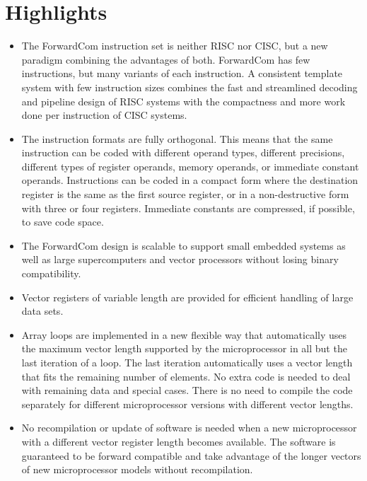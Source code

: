 \documentclass[forwardcom.tex]{subfiles}
\begin{document}
\section{Highlights}
\begin{itemize}
\item The ForwardCom instruction set is neither RISC nor CISC, but a new paradigm combining the advantages of both. ForwardCom has few instructions, but many variants of each instruction. A consistent template system with few instruction sizes combines the fast and streamlined decoding and pipeline design of RISC systems with the compactness and more work done per instruction of CISC systems. 

\item The instruction formats are fully orthogonal. This means that the same instruction can be coded with different operand types, different precisions, different types of register operands, memory operands, or immediate constant operands. Instructions can be coded in a compact form where the destination register is the same as the first source register, or in a non-destructive form with three or four registers. Immediate constants are compressed, if possible, to save code space.

\item The ForwardCom design is scalable to support small embedded systems as well as large supercomputers and vector processors without losing binary compatibility.

\item Vector registers of variable length are provided for efficient handling of large data sets.

\item Array loops are implemented  in a new flexible way that automatically uses the maximum vector length supported by the microprocessor in all but the last iteration of a loop. The last iteration automatically uses a vector length that fits the remaining number of elements. No extra code is needed to deal with remaining data and special cases. There is no need to compile the code separately for different microprocessor versions with different vector lengths.

\item No recompilation or update of software is needed when a new microprocessor with a different vector register length becomes available. The software is guaranteed to be forward compatible and take advantage of the longer vectors of new microprocessor models without recompilation.


\end{itemize}
\end{document}
